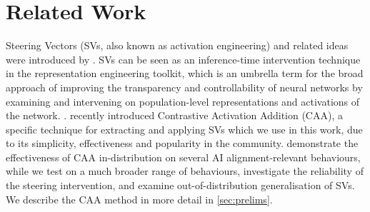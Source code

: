 \documentclass{article}
\begin{document}

\section{Related Work}

Steering Vectors (SVs, also known as activation engineering) and related ideas were introduced by \citet{turnerActivationAdditionSteering2023,zouRepresentationEngineeringTopDown2023,liuIncontextVectorsMaking2024}. SVs can be seen as an inference-time intervention \citep{liInferenceTimeInterventionEliciting2023a} technique in the representation engineering \citep{zouRepresentationEngineeringTopDown2023} toolkit, which is an umbrella term for the broad approach of improving the transparency and controllability of neural networks by examining and intervening on population-level representations and activations of the network.   \cite{rajendranLearningInterpretableConcepts2024}.  \citet{rimskySteeringLlamaContrastive2023} recently introduced Contrastive Activation Addition (CAA), a specific technique for extracting and applying SVs which we use in this work, due to its simplicity, effectiveness and popularity in the community. \citet{rimskySteeringLlamaContrastive2023} demonstrate the effectiveness of CAA in-distribution on several AI alignment-relevant behaviours, while we test on a much broader range of behaviours, investigate the reliability of the steering intervention, and examine out-of-distribution generalisation of SVs. We describe the CAA method in more detail in \cref{sec:prelims}.

\end{document}
